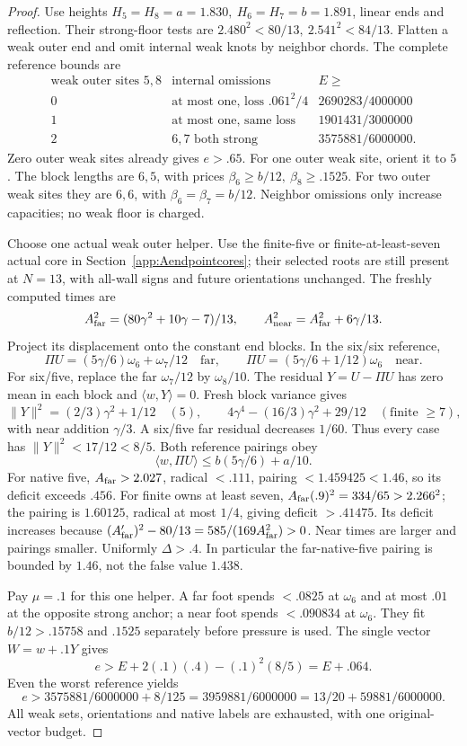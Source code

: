 \documentclass[11pt]{article}
\theoremstyle{definition}
\theoremstyle{remark}
\newcommand{\ip}[2]{\langle #1,#2\rangle}
\newcommand{\norm}[1]{\lVert #1\rVert}
\begin{document}
\begin{proof}
Use heights
\(H_5=H_8=a=1.830,\ H_6=H_7=b=1.891\),
linear ends and reflection.
Their strong-floor tests are
\(2.480^2<80/13,\ 2.541^2<84/13\).
Flatten a weak outer end and omit internal weak
knots by neighbor chords. The complete reference
bounds are
\[
\begin{array}{c|c|c}
\text{weak outer sites }5,8&
 \text{internal omissions}&E\geq\\ \hline
0&\text{at most one, loss } .061^2/4&
2690283/4000000\\
1&\text{at most one, same loss}&1901431/3000000\\
2&6,7\text{ both strong}&3575881/6000000.
\end{array}
\]
Zero outer weak sites already gives \(e>.65\).
For one outer weak site, orient it to \(5\).
The block lengths are \(6,5\), with prices
\(\beta_6\geq b/12,\ \beta_8\geq.1525\).
For two outer weak sites they are \(6,6\),
with \(\beta_6=\beta_7=b/12\).
Neighbor omissions only increase capacities;
no weak floor is charged.

Choose one actual weak outer helper.
Use the finite-five or finite-at-least-seven
actual core in Section~\ref{app:Aendpointcores};
their selected roots are still present at
\(N=13\), with all-wall signs and future
orientations unchanged.
The freshly computed times are
\[
 A_{\rm far}^2=(80\gamma^2+10\gamma-7)/13,\qquad
 A_{\rm near}^2=A_{\rm far}^2+6\gamma/13.
\]
Project its displacement onto the constant
end blocks. In the six/six reference,
\[
 \Pi U=(5\gamma/6)\omega_6+\omega_7/12
 \quad\text{far},\qquad
 \Pi U=(5\gamma/6+1/12)\omega_6
 \quad\text{near}.
\]
For six/five, replace the far \(\omega_7/12\)
by \(\omega_8/10\).
The residual \(Y=U-\Pi U\) has zero mean in
each block and \(\ip{w}{Y}=0\).
Fresh block variance gives
\[
 \norm{Y}^2=(2/3)\gamma^2+1/12\quad(5),\qquad
 4\gamma^4-(16/3)\gamma^2+29/12
                 \quad(\text{finite }\geq7),
\]
with near addition \(\gamma/3\).
A six/five far residual decreases \(1/60\).
Thus every case has \(\norm Y^2<17/12<8/5\).
Both reference pairings obey
\[
 \ip{w}{\Pi U}\leq b(5\gamma/6)+a/10.
\]
For native five, \(A_{\rm far}>2.027\),
radical \(<.111\), pairing \(<1.459425<1.46\),
so its deficit exceeds \(.456\).
For finite owns at least seven,
\(A_{\rm far}(.9)^2=334/65>2.266^2\);
the pairing is \(1.60125\), radical at most \(1/4\),
giving deficit \(>.41475\).
Its deficit increases because
\((A_{\rm far}')^2-80/13=585/(169A_{\rm far}^2)>0\).
Near times are larger and pairings smaller.
Uniformly \(\Delta>.4\).
In particular the far-native-five pairing is
bounded by \(1.46\), not the false value \(1.438\).

Pay \(\mu=.1\) for this one helper.
A far foot spends \(<.0825\) at \(\omega_6\)
and at most \(.01\) at the opposite strong
anchor; a near foot spends \(<.090834\)
at \(\omega_6\).
They fit \(b/12>.15758\) and \(.1525\)
separately before pressure is used.
The single vector \(W=w+.1Y\) gives
\[
 e>E+2(.1)(.4)-(.1)^2(8/5)=E+.064.
\]
Even the worst reference yields
\[
 e>3575881/6000000+8/125
  =3959881/6000000
  =13/20+59881/6000000.
\]
All weak sets, orientations and native labels
are exhausted, with one original-vector budget.
\end{proof}
\end{document}
